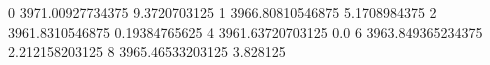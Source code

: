 0 3971.00927734375 9.3720703125
1 3966.80810546875 5.1708984375
2 3961.8310546875 0.19384765625
4 3961.63720703125 0.0
6 3963.849365234375 2.212158203125
8 3965.46533203125 3.828125
